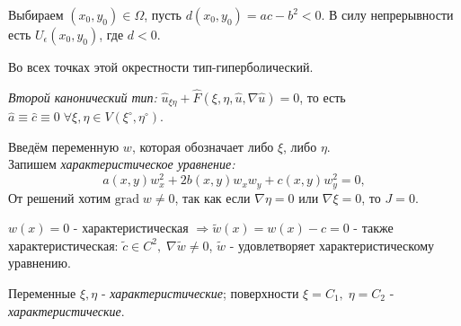 Выбираем $(x_0, y_0) \in \Omega$, пусть $d(x_0, y_0) = ac - b^2 < 0$. В силу непрерывности есть $U_\epsilon(x_0, y_0)$, где $d < 0$.



Во всех точках этой окрестности тип-гиперболический. \\
\begin{definition}
\textit{Второй канонический тип:} $\hat{u}_{\xi\eta} + \hat{F}(\xi, \eta, \hat{u}, \nabla \hat{u}) = 0$, то есть $\hat{a} \equiv \hat{c} \equiv 0\; \forall \xi, \eta \in V(\xi^{\circ}, \eta^{\circ})$.
\end{definition}
Введём переменную $w$, которая обозначает либо $\xi$, либо $\eta$.\\
Запишем \textit{характеристическое уравнение:}
\begin{equation*}
	a(x, y) w^{2}_x + 2b(x, y)w_x w_y + c(x, y)w_y^2  = 0, 
\end{equation*}
От решений хотим $\text{grad}\;w \neq 0$, так как если $\nabla \eta = 0$ или $\nabla \xi = 0$, то $J = 0$. \\
\begin{remark}
	$w(x) = 0$ - характеристическая $\Rightarrow \tilde{w}(x) =  w(x) - c = 0$ - также характеристическая: $\tilde{c} \in C^2,\; \nabla \tilde{w} \neq 0$, $\tilde{w}$ - удовлетворяет характеристическому уравнению.  \\
\end{remark}
\begin{definition}
Переменные $\xi, \eta$ - \textit{характеристические}; поверхности $\xi = C_1,\; \eta = C_2$ - \textit{характеристические}.
\end{definition} 
